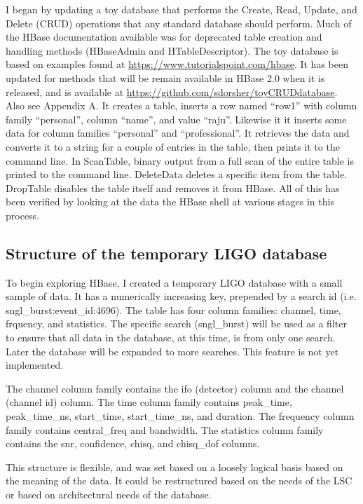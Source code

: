 \documentclass{article}
\begin{document}
I began by updating a toy database that performs the Create, Read,
Update, and Delete (CRUD) operations that any standard database should
perform. Much of the HBase documentation available was for deprecated
table creation and handling methods (HBaseAdmin and
HTableDescriptor). The toy database is based on examples found at
\url{https://www.tutorialspoint.com/hbase}. It has been updated for
methods that will be remain available in HBase 2.0 when it is
released, and is available at
\url{https://github.com/sdorsher/toyCRUDdatabase}. Also see Appendix
A. It creates a table, inserts a row named ``row1'' with column family
``personal'', column ``name'', and value ``raju''. Likewise it it
inserts some data for column families ``personal'' and
``professional''. It retrieves the data and converts it to a string
for a couple of entries in the table, then prints it to the command
line. In ScanTable, binary output from a full scan of the entire table
is printed to the command line. DeleteData deletes a specific item
from the table. DropTable disables the table itself and removes it
from HBase. All of this has been verified by looking at the data the
HBase shell at various stages in this process.



\subsection{Structure of the temporary LIGO database}

To begin exploring HBase, I created a temporary LIGO database with a
small sample of data. It has a numerically increasing key, prepended
by a search id (i.e. sngl\_burst:event\_id:4696). The table has four
column families: channel, time, frquency, and statistics. The specific
search (sngl\_burst) will be used as a filter to ensure that all data
in the database, at this time, is from only one search. Later the
database will be expanded to more searches. This feature is not yet
implemented.

The channel column family contains the ifo (detector) column and the
channel (channel id) column. The time column family contains
peak\_time, peak\_time\_ns, start\_time, start\_time\_ns, and
duration. The frequency column family contains central\_freq and
bandwidth. The statistics column family contains the snr, confidence,
chisq, and chisq\_dof columns.

This structure is flexible, and was set based on a loosely logical
basis based on the meaning of the data. It could be restructured based
on the needs of the LSC or based on architectural needs of
the database.
\end{document}
